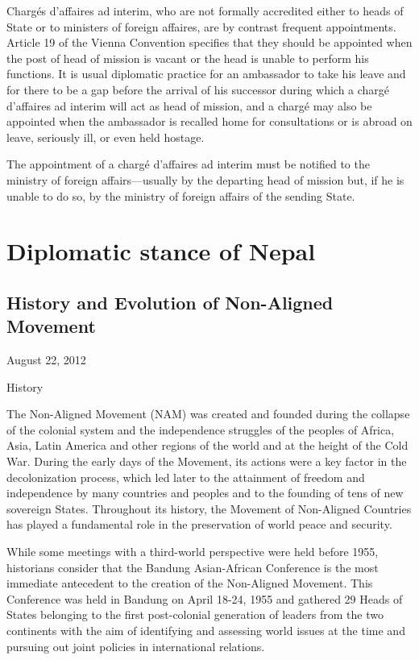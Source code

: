 \documentclass[
  openany]{book}
\begin{document}
Chargés d'affaires ad interim, who are not formally accredited either to heads of State or to ministers of foreign affaires, are by contrast frequent appointments. Article 19 of the Vienna Convention specifies that they should be appointed when the post of head of mission is vacant or the head is unable to perform his functions. It is usual diplomatic practice for an ambassador to take his leave and for there to be a gap before the arrival of his successor during which a chargé d'affaires ad interim will act as head of mission, and a chargé may also be appointed when the ambassador is recalled home for consultations or is abroad on leave, seriously ill, or even held hostage.

The appointment of a chargé d'affaires ad interim must be notified to the ministry of foreign affairs---usually by the departing head of mission but, if he is unable to do so, by the ministry of foreign affairs of the sending State.

\hypertarget{diplomatic-stance-of-nepal}{%
\section{Diplomatic stance of Nepal}\label{diplomatic-stance-of-nepal}}

\hypertarget{history-and-evolution-of-non-aligned-movement}{%
\subsection{History and Evolution of Non-Aligned Movement}\label{history-and-evolution-of-non-aligned-movement}}

August 22, 2012

History

The Non-Aligned Movement (NAM) was created and founded during the collapse of the colonial system and the independence struggles of the peoples of Africa, Asia, Latin America and other regions of the world and at the height of the Cold War. During the early days of the Movement, its actions were a key factor in the decolonization process, which led later to the attainment of freedom and independence by many countries and peoples and to the founding of tens of new sovereign States. Throughout its history, the Movement of Non-Aligned Countries has played a fundamental role in the preservation of world peace and security.

While some meetings with a third-world perspective were held before 1955, historians consider that the Bandung Asian-African Conference is the most immediate antecedent to the creation of the Non-Aligned Movement. This Conference was held in Bandung on April 18-24, 1955 and gathered 29 Heads of States belonging to the first post-colonial generation of leaders from the two continents with the aim of identifying and assessing world issues at the time and pursuing out joint policies in international relations.
\end{document}
